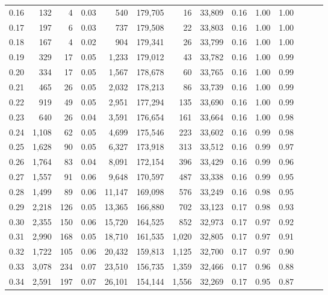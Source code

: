 \begin{tabular}{rrrrrrrrrrrrrr}
0.16 &    132 &      4 &  0.03 &      540 &  179,705 &      16 &  33,809 &  0.16 &  1.00 &      1.00 \\
0.17 &    197 &      6 &  0.03 &      737 &  179,508 &      22 &  33,803 &  0.16 &  1.00 &      1.00 \\
0.18 &    167 &      4 &  0.02 &      904 &  179,341 &      26 &  33,799 &  0.16 &  1.00 &      1.00 \\
0.19 &    329 &     17 &  0.05 &    1,233 &  179,012 &      43 &  33,782 &  0.16 &  1.00 &      0.99 \\
0.20 &    334 &     17 &  0.05 &    1,567 &  178,678 &      60 &  33,765 &  0.16 &  1.00 &      0.99 \\
0.21 &    465 &     26 &  0.05 &    2,032 &  178,213 &      86 &  33,739 &  0.16 &  1.00 &      0.99 \\
0.22 &    919 &     49 &  0.05 &    2,951 &  177,294 &     135 &  33,690 &  0.16 &  1.00 &      0.99 \\
0.23 &    640 &     26 &  0.04 &    3,591 &  176,654 &     161 &  33,664 &  0.16 &  1.00 &      0.98 \\
0.24 &  1,108 &     62 &  0.05 &    4,699 &  175,546 &     223 &  33,602 &  0.16 &  0.99 &      0.98 \\
0.25 &  1,628 &     90 &  0.05 &    6,327 &  173,918 &     313 &  33,512 &  0.16 &  0.99 &      0.97 \\
0.26 &  1,764 &     83 &  0.04 &    8,091 &  172,154 &     396 &  33,429 &  0.16 &  0.99 &      0.96 \\
0.27 &  1,557 &     91 &  0.06 &    9,648 &  170,597 &     487 &  33,338 &  0.16 &  0.99 &      0.95 \\
0.28 &  1,499 &     89 &  0.06 &   11,147 &  169,098 &     576 &  33,249 &  0.16 &  0.98 &      0.95 \\
0.29 &  2,218 &    126 &  0.05 &   13,365 &  166,880 &     702 &  33,123 &  0.17 &  0.98 &      0.93 \\
0.30 &  2,355 &    150 &  0.06 &   15,720 &  164,525 &     852 &  32,973 &  0.17 &  0.97 &      0.92 \\
0.31 &  2,990 &    168 &  0.05 &   18,710 &  161,535 &   1,020 &  32,805 &  0.17 &  0.97 &      0.91 \\
0.32 &  1,722 &    105 &  0.06 &   20,432 &  159,813 &   1,125 &  32,700 &  0.17 &  0.97 &      0.90 \\
0.33 &  3,078 &    234 &  0.07 &   23,510 &  156,735 &   1,359 &  32,466 &  0.17 &  0.96 &      0.88 \\
0.34 &  2,591 &    197 &  0.07 &   26,101 &  154,144 &   1,556 &  32,269 &  0.17 &  0.95 &      0.87 \\

\end{tabular}
